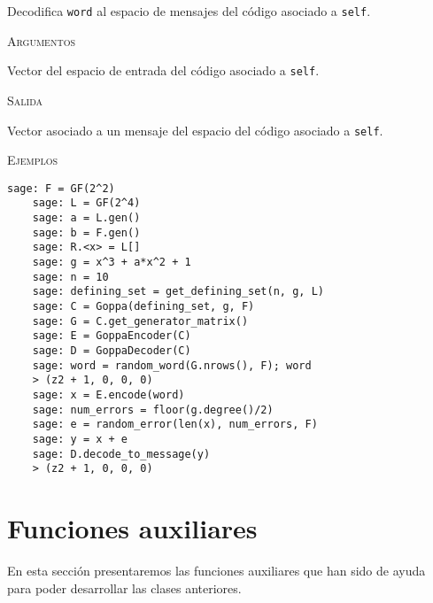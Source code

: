 \begin{description}[leftmargin=1em, font=\normalfont\ttfamily, style=nextline]
\begin{description}[font=\ttfamily, style=nextline]
  \item[decode\_to\_message(self, word)] Decodifica \texttt{word} al espacio de mensajes del código asociado a \texttt{self}.
      
  \textsc{Argumentos}
  \begin{description}[font=\normalfont\ttfamily]
      \item[word] Vector del espacio de entrada del código asociado a \texttt{self}.
  \end{description}

  \textsc{Salida}
  \begin{description}[font=\normalfont\ttfamily]
      \item[] Vector asociado a un mensaje del espacio del código asociado a \texttt{self}.
  \end{description}

  \textsc{Ejemplos}
  \begin{lstlisting}[gobble=4]
    sage: F = GF(2^2)
    sage: L = GF(2^4)
    sage: a = L.gen()
    sage: b = F.gen()
    sage: R.<x> = L[]
    sage: g = x^3 + a*x^2 + 1
    sage: n = 10
    sage: defining_set = get_defining_set(n, g, L)
    sage: C = Goppa(defining_set, g, F)
    sage: G = C.get_generator_matrix()
    sage: E = GoppaEncoder(C)
    sage: D = GoppaDecoder(C)
    sage: word = random_word(G.nrows(), F); word
    > (z2 + 1, 0, 0, 0)
    sage: x = E.encode(word)
    sage: num_errors = floor(g.degree()/2)
    sage: e = random_error(len(x), num_errors, F)
    sage: y = x + e
    sage: D.decode_to_message(y)
    > (z2 + 1, 0, 0, 0)
  \end{lstlisting}
  \end{description}
\end{description}

\section{Funciones auxiliares}

En esta sección presentaremos las funciones auxiliares que han sido de ayuda para poder desarrollar las clases anteriores.

